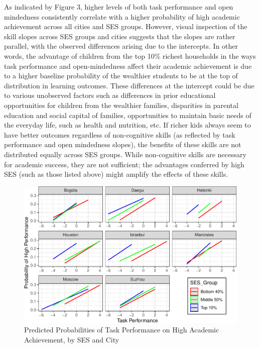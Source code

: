 \documentclass[
  12pt,
  a4paper,
]{article}
\begin{document}
As indicated by Figure 3, higher levels of both task performance and
open mindedness consistently correlate with a higher probability of high
academic achievement across all cities and SES groups. However, visual
inspection of the skill slopes across SES groups and cities suggests
that the slopes are rather parallel, with the observed differences
arising due to the intercepts. In other words, the advantage of children
from the top 10\% richest households in the ways task performance and
open-mindedness affect their academic achievement is due to a higher
baseline probability of the wealthier students to be at the top of
distribution in learning outcomes. These differences at the intercept
could be due to various unobserved factors such as differences in prior
educational opportunities for children from the wealthier families,
disparities in parental education and social capital of families,
opportunities to maintain basic needs of the everyday life, such as
health and nutrition, etc. If richer kids always seem to have better
outcomes regardless of non-cognitive skills (as reflected by task
performance and open mindedness slopes), the benefits of these skills
are not distributed equally across SES groups. While non-cognitive
skills are necessary for academic success, they are not sufficient; the
advantages conferred by high SES (such as those listed above) might
amplify the effects of these skills.

\begin{figure}
\centering
\includegraphics{ncs_and_academic_achievementRmd_files/figure-latex/scatter task perf-1.pdf}
\caption{Predicted Probabilities of Task Performance on High Academic
Achievement, by SES and City}
\end{figure}
\end{document}
